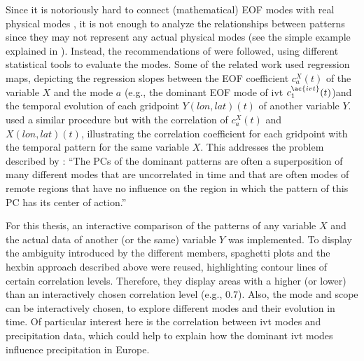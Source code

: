 Since it is notoriously hard to connect (mathematical) EOF modes with real physical modes \cite{hannachi_empirical_2007, dommenget_cautionary_2002}, it is not enough to analyze the relationships between patterns since they may not represent any actual physical modes (see the simple example explained in ). 
Instead, the recommendations of  were followed, using different statistical tools to evaluate the modes. 
Some of the related work \cite{zou_interdecadal_2018, zhou_atmospheric_2005, li_quasi-4-yr_2012} used regression maps, depicting the regression slopes between the EOF coefficient $c_a^X(t)$ of the variable $X$ and the mode $a$ (e.g., the dominant EOF mode of \ac{ivt} $c_1^{\ac{ivt}}(t)$)and the temporal evolution of each gridpoint $Y(lon, lat)(t)$ of another variable $Y$. 
 used a similar procedure but with the correlation of $c_a^X(t)$ and $X(lon, lat)(t)$, illustrating the correlation coefficient for each gridpoint with the temporal pattern for the same variable $X$. 
This addresses the problem described by \citeauthor{dommenget_cautionary_2002}: \enquote{The PCs of the dominant patterns are often a superposition of many different modes that are uncorrelated in time and that are often modes of remote regions that have no influence on the region in which the pattern of this PC has its center of action.} \cite{dommenget_cautionary_2002} 


For this thesis, an interactive comparison of the patterns of any variable $X$ and the actual data of another (or the same) variable $Y$ was implemented.
To display the ambiguity introduced by the different members, spaghetti plots and the hexbin approach described above were reused, highlighting contour lines of certain correlation levels. 
Therefore, they display areas with a higher (or lower) than an interactively chosen correlation level (e.g., $0.7$). 
Also, the mode and scope can be interactively chosen, to explore different modes and their evolution in time. 
Of particular interest here is the correlation between \ac{ivt} modes and precipitation data, which could help to explain how the dominant \ac{ivt} modes influence precipitation in Europe. 

%
%
%


